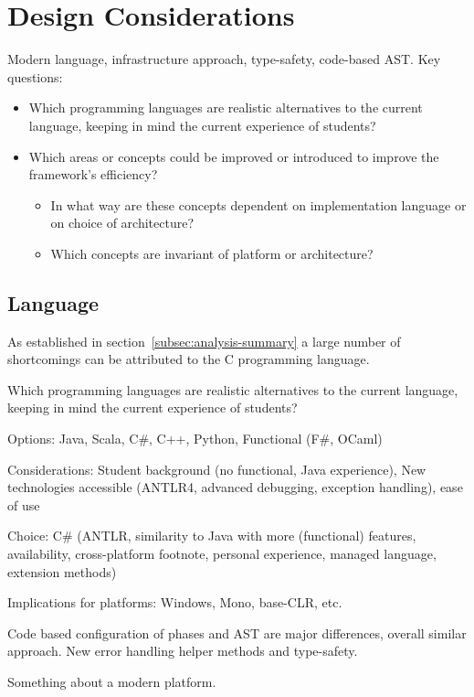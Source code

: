 \documentclass[twoside,openright]{uva-bachelor-thesis}
\begin{document}
\chapter{Design Considerations}
	Modern language, infrastructure approach, type-safety, code-based AST. Key questions:
	\begin{itemize}
		
		\item Which programming languages are realistic alternatives to the current language, keeping in mind the current experience of students?
		\item Which areas or concepts could be improved or introduced to improve the framework's efficiency?
		\begin{itemize}
			\item In what way are these concepts dependent on implementation language or on choice of architecture?
			\item Which concepts are invariant of platform or architecture?
		\end{itemize}
	\end{itemize}
	
	\section{Language}
		As established in section~\ref{subsec:analysis-summary} a large number of shortcomings can be attributed to the C programming language. 
		
		Which programming languages are realistic alternatives to the current language, keeping in mind the current experience of students?
		
		Options: Java, Scala, C\#, C++, Python, Functional (F\#, OCaml)
		
		Considerations: Student background (no functional, Java experience), New technologies accessible (ANTLR4, advanced debugging, exception handling), ease of use
		
		Choice: C\# (ANTLR, similarity to Java with more (functional) features, availability, cross-platform footnote, personal experience, managed language, extension methods)
		
		Implications for platforms: Windows, Mono, base-CLR, etc.
		
		Code based configuration of phases and AST are major differences, overall similar approach. New error handling helper methods and type-safety.
		
		Something about a modern platform.
		
\end{document}
